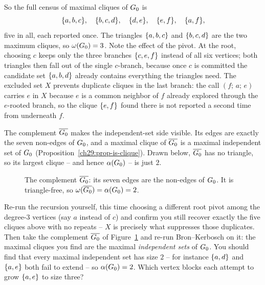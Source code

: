 So the full census of maximal cliques of $G_0$ is
\[
  \{a,b,c\},\quad \{b,c,d\},\quad \{d,e\},\quad \{e,f\},\quad \{a,f\},
\]
five in all, each reported once. The triangles $\{a,b,c\}$ and $\{b,c,d\}$ are
the two maximum cliques, so $\omega(G_0)=3$. Note the effect of the pivot. At
the root, choosing $c$ keeps only the three branches $\{c,e,f\}$ instead of all
six vertices; both triangles then fall out of the single $c$-branch, because once
$c$ is committed the candidate set $\{a,b,d\}$ already contains everything the
triangles need. The excluded set $X$ prevents duplicate cliques in the last branch: the call
$(f;\,a;\,e)$ carries $e$ in $X$ because $e$ is a common neighbor of $f$ already
explored through the $e$-rooted branch, so the clique $\{e,f\}$ found there is
not reported a second time from underneath $f$.

The complement $\overline{G_0}$ makes the independent-set side visible. Its
edges are exactly the seven non-edges of $G_0$, and a maximal clique of
$\overline{G_0}$ is a maximal independent set of $G_0$
(Proposition~\ref{ch29:prop-is-clique}). Drawn below, $\overline{G_0}$ has no
triangle, so its largest clique -- and hence $\alpha(G_0)$ -- is just $2$.

\begin{figure}[H]
\centering
{}
\caption{The complement $\overline{G_0}$: its seven edges are the non-edges of
$G_0$. It is triangle-free, so $\omega(\overline{G_0})=\alpha(G_0)=2$.}
\label{ch29:fig-complement}
\end{figure}

\begin{labbox}
Re-run the recursion yourself, this time choosing a different root pivot among the
degree-$3$ vertices (say $a$ instead of $c$) and confirm you still recover exactly
the five cliques above with no repeats -- $X$ is precisely what suppresses
those duplicates. Then take the complement
$\overline{G_0}$ of Figure~\ref{ch29:fig-complement} and re-run Bron--Kerbosch
on it: the maximal cliques you find are the maximal
\emph{independent sets} of $G_0$. You should find that every maximal
independent set has size $2$ -- for instance $\{a,d\}$ and $\{a,e\}$ both fail
to extend -- so $\alpha(G_0)=2$. Which vertex blocks each attempt to grow
$\{a,e\}$ to size three?
\end{labbox}

